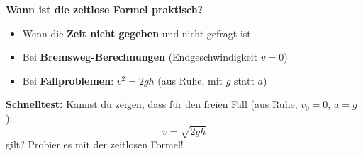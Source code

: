 \documentclass[11pt,a4paper]{article}
\begin{document}
\vspace{0.5cm}
\begin{merksatz}
\textbf{Wann ist die zeitlose Formel praktisch?}
\begin{itemize}
\item Wenn die \textbf{Zeit nicht gegeben} und nicht gefragt ist
\item Bei \textbf{Bremsweg-Berechnungen} (Endgeschwindigkeit $v = 0$)
\item Bei \textbf{Fallproblemen}: $v^2 = 2gh$ (aus Ruhe, mit $g$ statt $a$)
\end{itemize}
\end{merksatz}

\vspace{0.5cm}
\begin{tcolorbox}[colback=tipporange!10, colframe=tipporange, boxrule=0.5pt]
\textbf{Schnelltest:} Kannst du zeigen, dass für den freien Fall (aus Ruhe, $v_0 = 0$, $a = g$):
\[
v = \sqrt{2gh}
\]
gilt? Probier es mit der zeitlosen Formel!
\end{tcolorbox}
\end{document}
